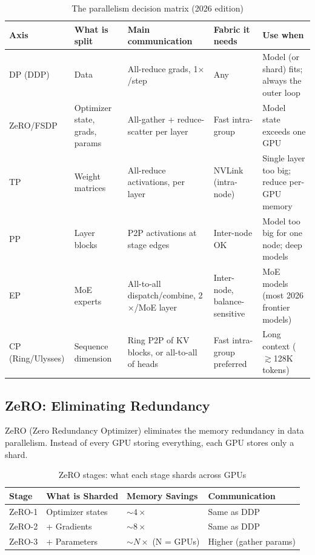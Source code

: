 \begin{table}[H]
\centering
\caption{The parallelism decision matrix (2026 edition)}
\begin{tabularx}{\textwidth}{lXXXX}
\toprule
\textbf{Axis} & \textbf{What is split} & \textbf{Main communication} & \textbf{Fabric it needs} & \textbf{Use when} \\
\midrule
DP (DDP) & Data & All-reduce grads, 1$\times$/step & Any & Model (or shard) fits; always the outer loop \\
ZeRO/FSDP & Optimizer state, grads, params & All-gather + reduce-scatter per layer & Fast intra-group & Model state exceeds one GPU \\
TP & Weight matrices & All-reduce activations, per layer & NVLink (intra-node) & Single layer too big; reduce per-GPU memory \\
PP & Layer blocks & P2P activations at stage edges & Inter-node OK & Model too big for one node; deep models \\
EP & MoE experts & All-to-all dispatch/combine, 2$\times$/MoE layer & Inter-node, balance-sensitive & MoE models (most 2026 frontier models) \\
CP (Ring/Ulysses) & Sequence dimension & Ring P2P of KV blocks, or all-to-all of heads & Fast intra-group preferred & Long context ($\gtrsim$128K tokens) \\
\bottomrule
\end{tabularx}
\end{table}

\subsection{ZeRO: Eliminating Redundancy}

ZeRO (Zero Redundancy Optimizer) eliminates the memory redundancy in data parallelism. Instead of every GPU storing everything, each GPU stores only a shard.

\begin{table}[H]
\centering
\caption{ZeRO stages: what each stage shards across GPUs}
\begin{tabularx}{\textwidth}{lXXl}
\toprule
\textbf{Stage} & \textbf{What is Sharded} & \textbf{Memory Savings} & \textbf{Communication} \\
\midrule
ZeRO-1 & Optimizer states & $\sim 4\times$ & Same as DDP \\
ZeRO-2 & + Gradients & $\sim 8\times$ & Same as DDP \\
ZeRO-3 & + Parameters & $\sim N\times$ (N = GPUs) & Higher (gather params) \\
\bottomrule
\end{tabularx}
\end{table}

